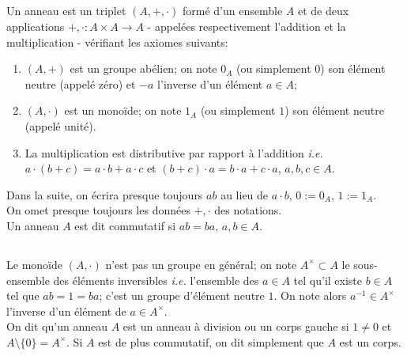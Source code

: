 \documentclass[a4paper, oneside, 12pt]{book}
\theoremstyle{theoremeStyle} %
\theoremstyle{definition} %
\newcommand{\ie}{\textit{i.e.}} %
\begin{document}
\subsection{}Un anneau est  un triplet $(A,+,\cdot)$ formé d'un ensemble $A$ et de deux applications $+,\cdot :A\times A\rightarrow A$ - appelées respectivement l'addition et la multiplication -  vérifiant les axiomes suivants:
\begin{enumerate}
\item $(A,+)$ est un groupe abélien; on note $0_A$ (ou simplement $0$) son élément neutre (appelé zéro) et $-a$ l'inverse d'un élément $a\in A$;
\item $(A ,\cdot)$ est un monoïde; on note $1_A$ (ou simplement $1$) son élément neutre (appelé unité).
\item La multiplication est distributive par rapport à l'addition \ie{} $a\cdot (b+c)=a\cdot b+a\cdot c$ et $(b+c)\cdot a=b\cdot a+c\cdot a$, $a,b,c\in A$.\\
\end{enumerate}
 Dans la suite, on écrira presque toujours $ab$ au lieu de $a\cdot b$, $0:=0_A$, $1:=1_A$.\\

 On omet presque toujours les données $+,\cdot$ des notations.\\


 Un anneau $A$ est dit commutatif si    $a b=ba$, $a,b\in A$. \\


\subsection{}Le monoïde $(A ,\cdot)$ n'est pas un groupe en général; on note $A^\times\subset A $ le sous-ensemble des éléments inversibles \ie{} l'ensemble des $ a\in A$ tel qu'il existe $b\in A$ tel que $ab=1=ba$; c'est un groupe d'élément neutre $1$. On note alors $a^{-1}\in A^\times$ l'inverse d'un élément de $a\in A^\times$.\\


 On dit qu'un anneau $A$ est un anneau à division ou un corps gauche si $1\not=0$ et $A\setminus \lbrace 0\rbrace=A^\times$. Si $A$ est de plus commutatif, on dit simplement que $A$ est un corps.\\
\end{document}
